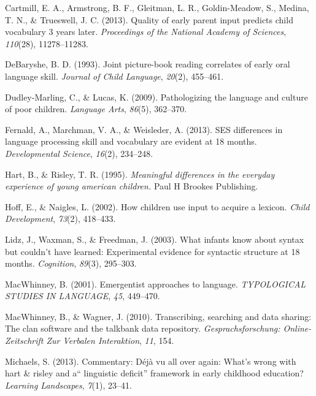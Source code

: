 \documentclass[floatsintext,man]{apa6}
\theoremstyle{definition}
\theoremstyle{definition}
\theoremstyle{definition}
\theoremstyle{remark}
\begin{document}
\hypertarget{ref-cartmill2013quality}{}
Cartmill, E. A., Armstrong, B. F., Gleitman, L. R., Goldin-Meadow, S.,
Medina, T. N., \& Trueswell, J. C. (2013). Quality of early parent input
predicts child vocabulary 3 years later. \emph{Proceedings of the
National Academy of Sciences}, \emph{110}(28), 11278--11283.

\hypertarget{ref-debaryshe1993joint}{}
DeBaryshe, B. D. (1993). Joint picture-book reading correlates of early
oral language skill. \emph{Journal of Child Language}, \emph{20}(2),
455--461.

\hypertarget{ref-dudley2009pathologizing}{}
Dudley-Marling, C., \& Lucas, K. (2009). Pathologizing the language and
culture of poor children. \emph{Language Arts}, \emph{86}(5), 362--370.

\hypertarget{ref-fernald2013ses}{}
Fernald, A., Marchman, V. A., \& Weisleder, A. (2013). SES differences
in language processing skill and vocabulary are evident at 18 months.
\emph{Developmental Science}, \emph{16}(2), 234--248.

\hypertarget{ref-hart1995meaningful}{}
Hart, B., \& Risley, T. R. (1995). \emph{Meaningful differences in the
everyday experience of young american children.} Paul H Brookes
Publishing.

\hypertarget{ref-hoff2002children}{}
Hoff, E., \& Naigles, L. (2002). How children use input to acquire a
lexicon. \emph{Child Development}, \emph{73}(2), 418--433.

\hypertarget{ref-lidz2003infants}{}
Lidz, J., Waxman, S., \& Freedman, J. (2003). What infants know about
syntax but couldn't have learned: Experimental evidence for syntactic
structure at 18 months. \emph{Cognition}, \emph{89}(3), 295--303.

\hypertarget{ref-macwhinney2001emergentist}{}
MacWhinney, B. (2001). Emergentist approaches to language.
\emph{TYPOLOGICAL STUDIES IN LANGUAGE}, \emph{45}, 449--470.

\hypertarget{ref-macwhinney2010transcribing}{}
MacWhinney, B., \& Wagner, J. (2010). Transcribing, searching and data
sharing: The clan software and the talkbank data repository.
\emph{Gesprachsforschung: Online-Zeitschrift Zur Verbalen Interaktion},
\emph{11}, 154.

\hypertarget{ref-michaels2013commentary}{}
Michaels, S. (2013). Commentary: Déjà vu all over again: What's wrong
with hart \& risley and a`` linguistic deficit'' framework in early
childhood education? \emph{Learning Landscapes}, \emph{7}(1), 23--41.
\end{document}
